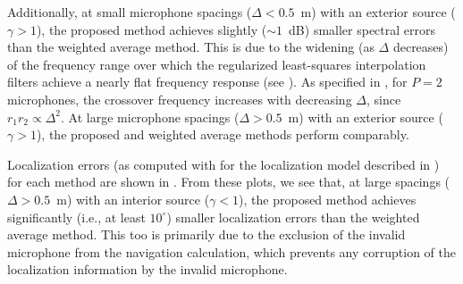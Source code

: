 Additionally, at small microphone spacings ($\Delta < 0.5$~m) with an exterior source ($\gamma > 1$), the proposed method achieves slightly ($\sim 1$~dB) smaller spectral errors than the weighted average method.
This is due to the widening (as $\Delta$ decreases) of the frequency range over which the regularized least-squares interpolation filters achieve a nearly flat frequency response (see ). %
As specified in , for $P = 2$ microphones, the crossover frequency increases with decreasing $\Delta$, since $r_1 r_2 \propto \Delta^2$.
At large microphone spacings ($\Delta > 0.5$~m) with an exterior source ($\gamma > 1$), the proposed and weighted average methods perform comparably.


Localization errors (as computed with  for the localization model described in ) for each method are shown in .
From these plots, we see that, at large spacings ($\Delta > 0.5$~m) with an interior source ($\gamma < 1$), the proposed method achieves significantly (i.e., at least $10^\circ$) smaller localization errors than the weighted average method.
This too is primarily due to the exclusion of the invalid microphone from the navigation calculation, which prevents any corruption of the localization information by the invalid microphone.

